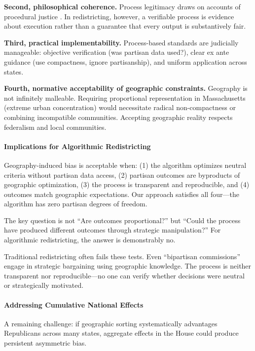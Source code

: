 \textbf{Second, philosophical coherence.} Process legitimacy draws on accounts of procedural justice \citep{rawls1971theory}. In redistricting, however, a verifiable process is evidence about execution rather than a guarantee that every output is substantively fair.

\textbf{Third, practical implementability.} Process-based standards are judicially manageable: objective verification (was partisan data used?), clear ex ante guidance (use compactness, ignore partisanship), and uniform application across states.

\textbf{Fourth, normative acceptability of geographic constraints.} Geography is not infinitely malleable. Requiring proportional representation in Massachusetts (extreme urban concentration) would necessitate radical non-compactness or combining incompatible communities. Accepting geographic reality respects federalism and local communities.

\paragraph{Implications for Algorithmic Redistricting}

Geography-induced bias is acceptable when: (1) the algorithm optimizes neutral criteria without partisan data access, (2) partisan outcomes are byproducts of geographic optimization, (3) the process is transparent and reproducible, and (4) outcomes match geographic expectations. Our approach satisfies all four---the algorithm has zero partisan degrees of freedom.

The key question is not ``Are outcomes proportional?'' but ``Could the process have produced different outcomes through strategic manipulation?'' For algorithmic redistricting, the answer is demonstrably no.

Traditional redistricting often fails these tests. Even ``bipartisan commissions'' engage in strategic bargaining using geographic knowledge. The process is neither transparent nor reproducible---no one can verify whether decisions were neutral or strategically motivated.

\paragraph{Addressing Cumulative National Effects}

A remaining challenge: if geographic sorting systematically advantages Republicans across many states, aggregate effects in the House could produce persistent asymmetric bias.


